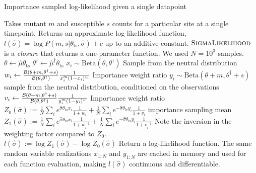 \documentclass[11pt]{article}
\newcommand{\ts}{{\text{ts}}}
\newcommand{\CommentG}[1]{{\color{gray}\Comment #1}}
\begin{document}
\begin{algorithm}[h!]
\caption{Importance sampled log-likelihood given a single datapoint}\label{alg:loglike}
\begin{algorithmic}
\Procedure{SigmaLikelihood}{$\hat{\mu},\hat{\mu}^\dagger, m, s, \theta_\ts, N$} 
\CommentG{Takes mutant $m$ and susceptible $s$ counts for a particular site at a single timepoint. Returns an approximate log-likelihood function, $l(\hat{\sigma}) = \log P(m, s |\theta_{\ts},\hat{\sigma}) +c$ up to an additive constant. $\textsc{SigmaLikelihood}$ is a {\em closure} that returns a one-parameter function. We used $N = 10^3$ samples.} 
\State $\theta \gets \hat{\mu} \theta_\ts$
\State $\theta^\dagger \gets \hat{\mu}^\dagger \theta_\ts$
\State $x_i \sim \text{Beta}(\theta,\theta^\dagger)$ \CommentG{Sample from the neutral distribution}\\
\State $w_i \gets \frac{{\cal B}(\theta + m, \theta^\dagger+s)}{{\cal B}(\theta,\theta^\dagger)} \frac{1}{x_i^m (1-x_i)^w } $  \CommentG{Importance weight ratio}
\State $y_i \sim  \text{Beta}(\theta + m, \theta^\dagger+s)$ \CommentG{sample from the neutral distribution, conditioned on the observations} 
\State $v_i \gets \frac{{\cal B}(\theta + m, \theta^\dagger+s)}{{\cal B}(\theta,\theta^\dagger)} \frac{1}{y_i^m (1-y_i)^w } $  \CommentG{Importance weight ratio}
\EndFor
\State $Z_0(\hat{\sigma}) := \frac{1}{N} \sum_i e^{\hat{\sigma} \theta_\ts x_i} \frac{1}{1+w_i} + \frac{1}{N} \sum_i e^{-\hat{\sigma} \theta_\ts y_i} \frac{1}{1+v_i} $ \CommentG{importance sampling mean}
\State $Z_1(\hat{\sigma}) := \frac{1}{N} \sum_i e^{\hat{\sigma} \theta_\ts x_i} \frac{1}{1+w_i^{-1}} + \frac{1}{N} \sum_i e^{-\hat{\sigma} \theta_\ts y_i} \frac{1}{1+v_i^{-1}}$  \CommentG{Note the inversion in the weighting factor compared to $Z_0$.}
\\
\Return $l (\hat{\sigma}) := \log Z_1(\hat{\sigma}) - \log Z_0(\hat{\sigma})$ \CommentG{Return a log-likelihood function. The same random variable realizations $x_{1:N}$ and $y_{1:N}$ are cached in memory and used for each function evaluation, making $l (\hat{\sigma})$ continuous and differentiable.}
\EndProcedure
\end{algorithmic}
\end{algorithm}
\end{document}
